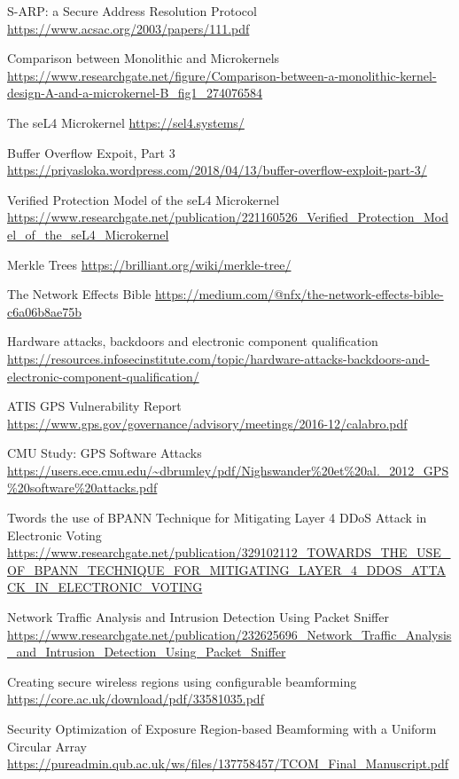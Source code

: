 \documentclass[11pt]{article}
\begin{document}
\begin{thebibliography}{7}
S-ARP: a Secure Address Resolution Protocol
\url{https://www.acsac.org/2003/papers/111.pdf}

Comparison between Monolithic and Microkernels
\url{https://www.researchgate.net/figure/Comparison-between-a-monolithic-kernel-design-A-and-a-microkernel-B_fig1_274076584}

The seL4 Microkernel
\url{https://sel4.systems/}

Buffer Overflow Expoit, Part 3
\url{https://priyasloka.wordpress.com/2018/04/13/buffer-overflow-exploit-part-3/}

Veriﬁed Protection Model of the seL4
Microkernel
\url{https://www.researchgate.net/publication/221160526_Verified_Protection_Model_of_the_seL4_Microkernel}

Merkle Trees
\url{https://brilliant.org/wiki/merkle-tree/}

The Network Effects Bible
\url{https://medium.com/@nfx/the-network-effects-bible-c6a06b8ae75b}

Hardware attacks, backdoors and electronic component qualification
\url{https://resources.infosecinstitute.com/topic/hardware-attacks-backdoors-and-electronic-component-qualification/}

ATIS GPS Vulnerability Report
\url{https://www.gps.gov/governance/advisory/meetings/2016-12/calabro.pdf}

CMU Study: GPS Software Attacks
\url{https://users.ece.cmu.edu/~dbrumley/pdf/Nighswander\%20et\%20al._2012_GPS\%20software\%20attacks.pdf}

Twords the use of BPANN Technique for Mitigating Layer 4 DDoS Attack in Electronic Voting
\url{https://www.researchgate.net/publication/329102112_TOWARDS_THE_USE_OF_BPANN_TECHNIQUE_FOR_MITIGATING_LAYER_4_DDOS_ATTACK_IN_ELECTRONIC_VOTING}

Network Traffic Analysis and Intrusion Detection Using Packet Sniffer
\url{https://www.researchgate.net/publication/232625696_Network_Traffic_Analysis_and_Intrusion_Detection_Using_Packet_Sniffer}

Creating secure wireless regions using configurable beamforming
\url{https://core.ac.uk/download/pdf/33581035.pdf}

Security Optimization of Exposure Region-based Beamforming with a Uniform Circular Array
\url{https://pureadmin.qub.ac.uk/ws/files/137758457/TCOM_Final_Manuscript.pdf}


\end{thebibliography}
\end{document}
